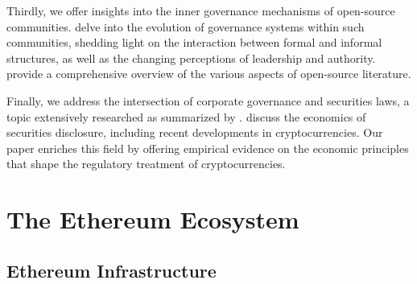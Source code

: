 \documentclass[No]{AEA}
\begin{document}
Thirdly, we offer insights into the inner governance mechanisms of open-source communities. \cite{Mahony_Ferraro2007} delve into the evolution of governance systems within such communities, shedding light on the interaction between formal and informal structures, as well as the changing perceptions of leadership and authority. \cite{LernerTirole2005} provide a comprehensive overview of the various aspects of open-source literature. 

Finally, we address the intersection of corporate governance and securities laws, a topic extensively researched as summarized by \cite{Mahoney2009}. \cite{Choi_Pritchard2019} discuss the economics of securities disclosure, including recent developments in cryptocurrencies. Our paper enriches this field by offering empirical evidence on the economic principles that shape the regulatory treatment of cryptocurrencies.


\section{The Ethereum Ecosystem}


\subsection{Ethereum Infrastructure}
\end{document}
